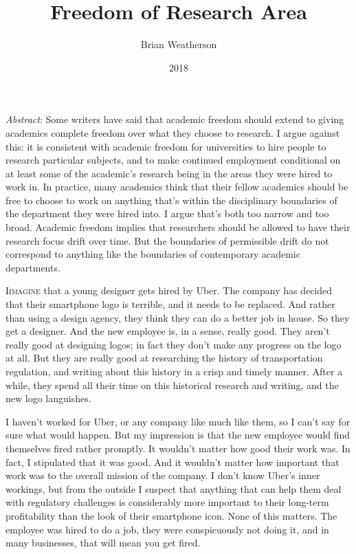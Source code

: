 \documentclass[
  11pt,
  letterpaper,
  DIV=11,
  numbers=noendperiod,
  twoside]{scrartcl}
\title{Freedom of Research Area}
\author{Brian Weatherson}
\date{2018}
\renewenvironment{abstract}
 {\vspace{-1.25cm}
 \quotation\small\noindent\emph{Abstract}:}
 {\endquotation}
\renewenvironment{abstract}
 {\quotation\small\noindent\emph{Abstract}:}
 {\endquotation\vspace{-0.02cm}}
\begin{document}
\maketitle
\begin{abstract}
Some writers have said that academic freedom should extend to giving
academics complete freedom over what they choose to research. I argue
against this: it is consistent with academic freedom for universities to
hire people to research particular subjects, and to make continued
employment conditional on at least some of the academic's research being
in the areas they were hired to work in. In practice, many academics
think that their fellow academics should be free to choose to work on
anything that's within the disciplinary boundaries of the department
they were hired into. I argue that's both too narrow and too broad.
Academic freedom implies that researchers should be allowed to have
their research focus drift over time. But the boundaries of permissible
drift do not correspond to anything like the boundaries of contemporary
academic departments.
\end{abstract}


\lettrine{I}{imagine} that a young designer gets hired by Uber. The
company has decided that their smartphone logo is terrible, and it needs
to be replaced. And rather than using a design agency, they think they
can do a better job in house. So they get a designer. And the new
employee is, in a sense, really good. They aren't really good at
designing logos; in fact they don't make any progress on the logo at
all. But they are really good at researching the history of
transportation regulation, and writing about this history in a crisp and
timely manner. After a while, they spend all their time on this
historical research and writing, and the new logo languishes.

I haven't worked for Uber, or any company like much like them, so I
can't say for sure what would happen. But my impression is that the new
employee would find themselves fired rather promptly. It wouldn't matter
how good their work was. In fact, I stipulated that it was good. And it
wouldn't matter how important that work was to the overall mission of
the company. I don't know Uber's inner workings, but from the outside I
suspect that anything that can help them deal with regulatory challenges
is considerably more important to their long-term profitability than the
look of their smartphone icon. None of this matters. The employee was
hired to do a job, they were conspicuously not doing it, and in many
businesses, that will mean you get fired.
\end{document}
